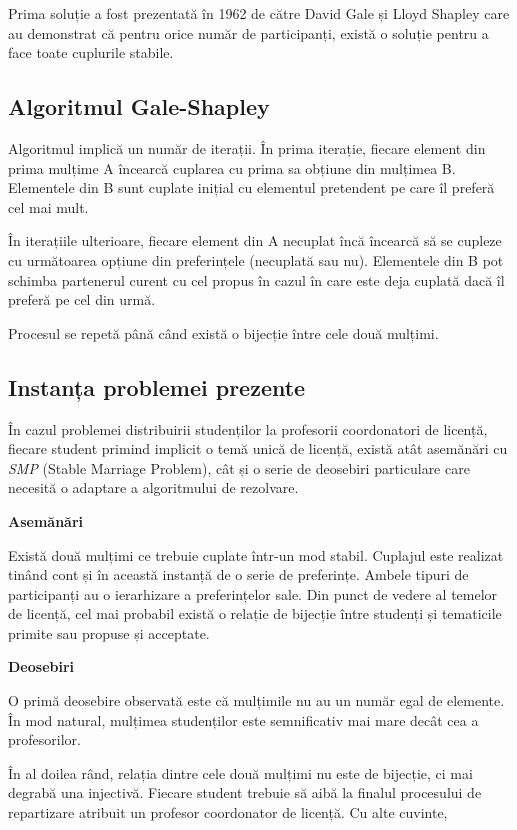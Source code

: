 Prima soluție a fost prezentată în 1962 de către David Gale și Lloyd Shapley care au demonstrat că pentru orice număr de participanți, există o soluție pentru a face toate cuplurile stabile.

\subsection{Algoritmul Gale-Shapley}
Algoritmul implică un număr de iterații. În prima iterație, fiecare element din prima mulțime A încearcă cuplarea cu prima sa obțiune din mulțimea B. Elementele din B sunt cuplate inițial cu elementul pretendent pe care îl preferă cel mai mult.

În iterațiile ulterioare, fiecare element din A necuplat încă încearcă să se cupleze cu următoarea opțiune din preferințele (necuplată sau nu). Elementele din B pot schimba partenerul curent cu cel propus în cazul în care este deja cuplată dacă îl preferă pe cel din urmă.

Procesul se repetă până când există o bijecție între cele două mulțimi.

\subsection{Instanța problemei prezente}
În cazul problemei distribuirii studenților la profesorii coordonatori de licență, fiecare student primind implicit o temă unică de licență, există atât asemănări cu \textit{SMP} (Stable Marriage Problem), cât și o serie de deosebiri particulare care necesită o adaptare a algoritmului de rezolvare.

\textbf{Asemănări}

Există două mulțimi ce trebuie cuplate într-un mod stabil. Cuplajul este realizat tinând cont și în această instanță de o serie de preferințe. Ambele tipuri de participanți au o ierarhizare a preferințelor sale. Din punct de vedere al temelor de licență, cel mai probabil există o relație de bijecție între studenți și tematicile primite sau propuse și acceptate.

\textbf{Deosebiri}

O primă deosebire observată este că mulțimile nu au un număr egal de elemente. În mod natural, mulțimea studenților este semnificativ mai mare decât cea a profesorilor.

În al doilea rând, relația dintre cele două mulțimi nu este de bijecție, ci mai degrabă una injectivă. Fiecare student trebuie să aibă la finalul procesului de repartizare atribuit un profesor coordonator de licență. Cu alte cuvinte,

